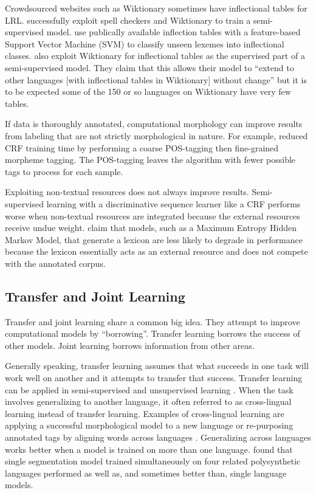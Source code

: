 \documentclass[12pt]{article}
\begin{document}
Crowdsourced websites such as Wiktionary sometimes have inflectional tables for LRL.  successfully exploit spell checkers and Wiktionary to train a semi-supervised model.  use publically available inflection tables with a feature-based Support Vector Machine (SVM) to classify unseen lexemes into inflectional classes.  also exploit Wiktionary for inflectional tables as the supervised part of a semi-supervised model. They claim that this allows their model to ``extend to other languages [with inflectional tables in Wiktionary] without change'' but it is to be expected some of the 150 or so languages on Wiktionary have very few tables. 

If data is thoroughly annotated, computational morphology can improve results from labeling that are not strictly morphological in nature. For example,  reduced CRF training time by performing a coarse POS-tagging then fine-grained morpheme tagging. The POS-tagging leaves the algorithm with fewer possible tags to process for each sample. 

Exploiting non-textual resources does not always improve results. Semi-supervised learning with a discriminative sequence learner like a CRF performs worse when non-textual resources are integrated because the external resources receive undue weight.  claim that models, such as a Maximum Entropy Hidden Markov Model, that generate a lexicon are less likely to degrade in performance because the lexicon essentially acts as an external resource and does not compete with the annotated corpus. 

\subsection{Transfer and Joint Learning}
\label{transfer}

Transfer and joint learning share a common big idea. They attempt to improve computational models by ``borrowing''. Transfer learning borrows the success of other models. Joint learning borrows information from other areas. 

Generally speaking, transfer learning assumes that what succeeds in one task will work well on another and it attempts to transfer that success. Transfer learning can be applied in semi-supervised and unsupervised learning \cite{duong_natural_2017}. When the task involves generalizing to another language, it often referred to as cross-lingual learning instead of transfer learning. Examples of cross-lingual learning are applying a successful morphological model to a new language or re-purposing annotated tags by aligning words across languages \cite{duong_natural_2017}. Generalizing across languages works better when a model is trained on more than one language.  found that single segmentation model trained simultaneously on four related polysynthetic languages performed as well as, and sometimes better than, single language models.
\end{document}
